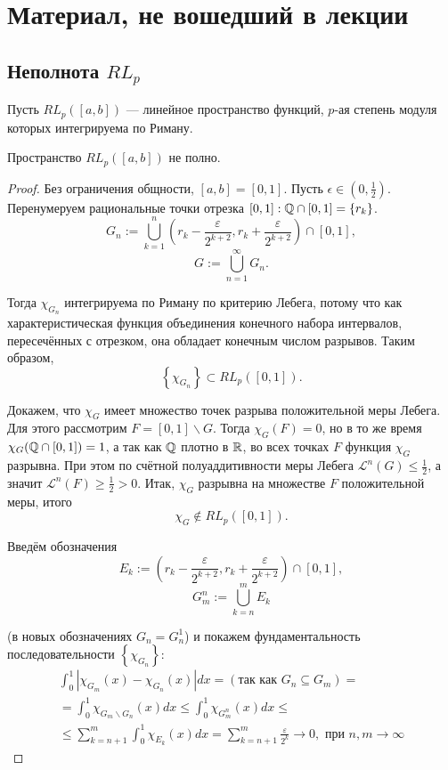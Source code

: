\section{Материал, не вошедший в лекции}
\subsection{Неполнота $RL_p$}
\begin{definition}
    Пусть $RL_p([a,b])$ — линейное пространство функций, $p$-ая степень модуля которых интегрируема по Риману.
\end{definition} 

\begin{theorem}
    Пространство $R L_p([a, b])$ не полно.
\end{theorem} 
\begin{proof}
    Без ограничения общности, $[a, b]=[0,1]$.
    Пусть $\epsilon \in\left(0, \frac{1}{2}\right)$.
    Перенумеруем рациональные точки отрезка $[0,1]: \mathbb{Q} \cap[0,1]=\left\{r_k\right\}$.
    $$
    G_n:=\bigcup_{k=1}^n\left(r_k-\frac{\varepsilon}{2^{k+2}}, r_k+\frac{\varepsilon}{2^{k+2}}\right) \cap[0,1],
    $$
    $$G:=\bigcup_{n=1}^{\infty} G_n.$$

    Тогда $\chi_{G_n}$ интегрируема по Риману по критерию Лебега, потому что как характеристическая функция объединения конечного набора интервалов, пересечённых с отрезком, она обладает конечным числом разрывов. Таким образом,
    \begin{equation*}
    \left\{\chi_{G_n}\right\} \subset R L_p([0,1]).
    \end{equation*}

    Докажем, что $\chi_G$ имеет множество точек разрыва положительной меры Лебега. Для этого рассмотрим $F=[0,1] \backslash G$. Тогда $\chi_G(F)=0$, но в то же время $\chi_G(\mathbb{Q} \cap[0,1])=1$, а так как $\mathbb{Q}$ плотно в $\mathbb{R}$, во всех точках $F$ функция $\chi_G$ разрывна. При этом по счётной полуаддитивности меры Лебега $\mathcal{L}^n(G) \leqslant \frac{1}{2}$, а значит $\mathcal{L}^n(F) \geqslant \frac{1}{2}>0$. Итак, $\chi_G$ разрывна на множестве $F$ положительной меры, итого
    \begin{equation*}
    \chi_G \notin R L_p([0,1]).
    \end{equation*}

    Введём обозначения
    $$
    E_k:=\left(r_k-\frac{\varepsilon}{2^{k+2}}, r_k+\frac{\varepsilon}{2^{k+2}}\right) \cap[0,1],
    $$
    $$G_m^n:=\bigcup_{k=n}^m E_k$$

    (в новых обозначениях $G_n=G_n^1$) и покажем фундаментальность последовательности $\left\{\chi_{G_n}\right\}$:
    \begin{multline*}
    \int_0^1\left|\chi_{G_m}(x)-\chi_{G_n}(x)\right| d x
    =
    (\text {так как } G_n \subseteq G_m)
    =\\=
    \int_0^1 \chi_{G_m \backslash G_n}(x) d x \leqslant \int_0^1 \chi_{G_m^n}(x) d x \leqslant \\
    \leqslant \sum_{k=n+1}^m \int_0^1 \chi_{E_k}(x) d x=\sum_{k=n+1}^m \frac{\varepsilon}{2^k} \rightarrow 0, \text { при } n, m \rightarrow \infty
    \end{multline*} 


\end{proof}
